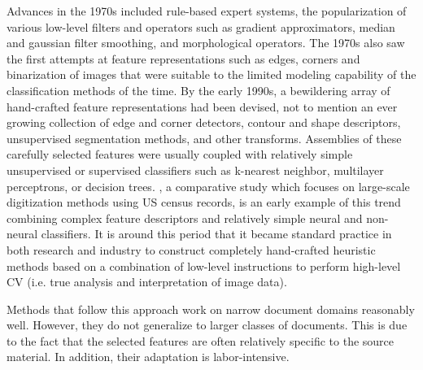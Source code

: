 Advances in the 1970s included rule-based expert systems, the
popularization of various low-level filters and operators such as gradient
approximators, median and gaussian filter smoothing, and morphological
operators. The 1970s also saw the first attempts at feature representations
such as edges, corners and binarization\cite{otsu1979threshold} of images that
were suitable to the limited modeling capability of the classification methods
of the time. By the early 1990s, a bewildering array of hand-crafted feature
representations had been devised, not to mention an ever growing collection of
edge and corner detectors, contour and shape descriptors, unsupervised
segmentation methods, and other transforms. Assemblies of these carefully
selected features were usually coupled with relatively simple unsupervised or
supervised classifiers such as k-nearest neighbor, multilayer perceptrons, or
decision trees. \cite{wilkinson1992first} , a comparative study which focuses
on large-scale digitization methods using US census records, is an early
example of this trend combining complex feature descriptors and relatively
simple neural and non-neural classifiers. It is around this period that it
became standard practice in both research and industry to construct completely
hand-crafted heuristic methods based on a combination of low-level instructions
to perform high-level CV (i.e. true analysis and interpretation of image data).

Methods that follow this approach work on narrow document domains reasonably
well. However, they do not generalize to larger classes of documents. This is
due to the fact that the selected features are often relatively specific to the
source material. In addition, their adaptation is labor-intensive.

